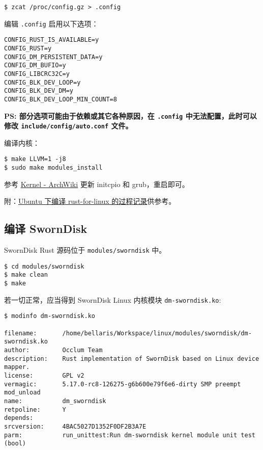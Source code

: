 \begin{verbatim}
$ zcat /proc/config.gz > .config
\end{verbatim}

编辑 \texttt{.config} 启用以下选项：

\begin{verbatim}
CONFIG_RUST_IS_AVAILABLE=y 
CONFIG_RUST=y 
CONFIG_DM_PERSISTENT_DATA=y 
CONFIG_DM_BUFIO=y 
CONFIG_LIBCRC32C=y 
CONFIG_BLK_DEV_LOOP=y 
CONFIG_BLK_DEV_DM=y 
CONFIG_BLK_DEV_LOOP_MIN_COUNT=8
\end{verbatim}

\textbf{PS: 部分选项可能由于依赖或其它各种原因，在 \texttt{.config} 中无法配置，此时可以修改 \texttt{include/config/auto.conf} 文件。}

编译内核：

\begin{verbatim}
$ make LLVM=1 -j8
$ sudo make modules_install
\end{verbatim}

参考 \href{https://wiki.archlinux.org/title/Kernel_(%E7%AE%80%E4%BD%93%E4%B8%AD%E6%96%87)/Traditional_compilation_(%E7%AE%80%E4%BD%93%E4%B8%AD%E6%96%87)}{Kernel - ArchWiki} 更新 initcpio 和 grub，重启即可。

附：\href{https://kirainmoe.feishu.cn/wiki/wikcnyStut2uUsg0RBWGwtOoaPc}{Ubuntu 下编译 rust-for-linux 的过程记录}供参考。

\subsection{编译 SwornDisk}

SwornDisk Rust 源码位于 \texttt{modules/sworndisk} 中。

\begin{verbatim}
$ cd modules/sworndisk
$ make clean
$ make
\end{verbatim}

若一切正常，应当得到 SwornDisk Linux 内核模块 \texttt{dm-sworndisk.ko}:

\begin{verbatim}
$ modinfo dm-sworndisk.ko

filename:       /home/bellaris/Workspace/linux/modules/sworndisk/dm-sworndisk.ko
author:         Occlum Team
description:    Rust implementation of SwornDisk based on Linux device mapper.
license:        GPL v2
vermagic:       5.17.0-rc8-126275-g6b600e79f6e6-dirty SMP preempt mod_unload 
name:           dm_sworndisk
retpoline:      Y
depends:        
srcversion:     4BAC5027D1352F0DF2B3A7E
parm:           run_unittest:Run dm-sworndisk kernel module unit test (bool)
\end{verbatim}

